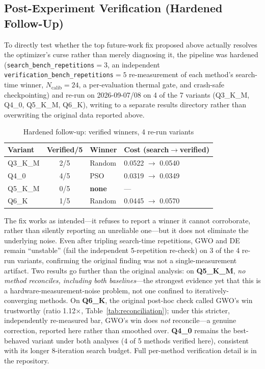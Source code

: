 \documentclass[conference, letterpaper]{IEEEtran}
\begin{document}
\subsection{Post-Experiment Verification (Hardened Follow-Up)}
\label{sec:hardened-followup}

To directly test whether the top future-work fix proposed above actually resolves the optimizer's curse rather than merely diagnosing it, the pipeline was hardened (\texttt{search\_bench\_repetitions}$=3$, an independent \texttt{verification\_bench\_repetitions}$=5$ re-measurement of each method's search-time winner, $N_{\text{calib}}=24$, a per-evaluation thermal gate, and crash-safe checkpointing) and re-run on 2026-09-07/08 on 4 of the 7 variants (Q3\_K\_M, Q4\_0, Q5\_K\_M, Q6\_K), writing to a separate results directory rather than overwriting the original data reported above.

\begin{table}[t]
\caption{Hardened follow-up: verified winners, 4 re-run variants}
\label{tab:hardened-followup}
\centering
\footnotesize
\begin{tabular}{@{}lcll@{}}
\toprule
Variant & Verified/5 & Winner & Cost (search$\to$verified) \\
\midrule
Q3\_K\_M & 2/5 & Random & 0.0522 $\to$ 0.0540 \\
Q4\_0    & 4/5 & PSO    & 0.0319 $\to$ 0.0349 \\
Q5\_K\_M & 0/5 & \textbf{none} & --- \\
Q6\_K    & 1/5 & Random & 0.0445 $\to$ 0.0570 \\
\bottomrule
\end{tabular}
\end{table}

The fix works as intended---it refuses to report a winner it cannot corroborate, rather than silently reporting an unreliable one---but it does not eliminate the underlying noise. Even after tripling search-time repetitions, GWO and DE remain ``unstable'' (fail the independent 5-repetition re-check) on 3 of the 4 re-run variants, confirming the original finding was not a single-measurement artifact. Two results go further than the original analysis: on \textbf{Q5\_K\_M}, \emph{no method reconciles, including both baselines}---the strongest evidence yet that this is a hardware-measurement-noise problem, not one confined to iteratively-converging methods. On \textbf{Q6\_K}, the original post-hoc check called GWO's win trustworthy (ratio 1.12$\times$, Table~\ref{tab:reconciliation}); under this stricter, independently re-measured bar, GWO's win does \emph{not} reconcile---a genuine correction, reported here rather than smoothed over. \textbf{Q4\_0} remains the best-behaved variant under both analyses (4 of 5 methods verified here), consistent with its longer 8-iteration search budget. Full per-method verification detail is in the repository.
\end{document}
